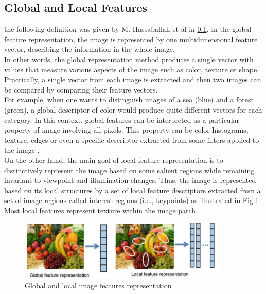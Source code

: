 \subsection{Global and Local Features}
the following definition was given by M. Hassaballah et al in \ref{}. 
In the global feature representation, the image is represented by one multidimensional
feature vector, describing the information in the whole image.\\
In other words, the global representation method produces a single vector with values that
measure various aspects of the image such as color, texture or shape. Practically, a
single vector from each image is extracted and then two images can be compared by
comparing their feature vectors.\\ For example, when one wants to distinguish images
of a sea (blue) and a forest (green), a global descriptor of color would produce quite
different vectors for each category. In this context, global features can be interpreted
as a particular property of image involving all pixels.
This property can be color
histograms, texture, edges or even a specific descriptor extracted from some filters
applied to the image \cite{h}.\\ On the other hand, the main goal of local feature representation
is to distinctively represent the image based on some salient regions while
remaining invariant to viewpoint and illumination changes. Thus, the image is represented
based on its local structures by a set of local feature descriptors extracted
from a set of image regions called interest regions (i.e., keypoints) as illustrated in
Fig.\ref{fig:Ft1} Most local features represent texture within the image patch.

\begin{figure}[H]
\centering
\includegraphics[width=0.9\textwidth]{img/features.PNG}
\caption{ Global and local image features representation }
\label{fig:Ft1}
\end{figure}

